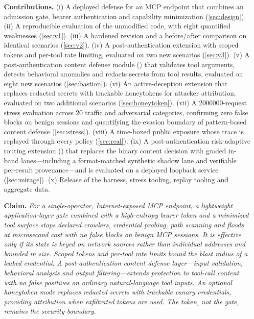 \documentclass[10pt,twocolumn]{article}
\begin{document}
\noindent\textbf{Contributions.}
(i) A deployed defense for an MCP endpoint that combines an admission gate,
bearer authentication and capability minimization (\cref{sec:design}).
(ii) A reproducible evaluation of the unmodified code, with eight quantified
weaknesses (\cref{sec:v1}).
(iii) A hardened revision and a before/after comparison on identical scenarios
(\cref{sec:v2}).
(iv) A post-authentication extension with scoped tokens and per-tool rate
limiting, evaluated on two new scenarios (\cref{sec:v3}).
(v) A post-authentication content defense module (\bastion{}) that validates
tool arguments, detects behavioral anomalies and redacts secrets from tool
results, evaluated on eight new scenarios (\cref{sec:bastion}).
(vi) An active-deception extension that replaces redacted secrets with
trackable honeytokens for attacker attribution, evaluated on two additional
scenarios (\cref{sec:honeytoken}).
(vii) A \num{2000000}-request stress evaluation across 20 traffic and
adversarial categories, confirming zero false blocks on benign sessions and
quantifying the evasion boundary of pattern-based content defense
(\cref{sec:stress}).
(viii) A time-boxed public exposure whose trace is replayed through every
policy (\cref{sec:real}).
(ix) A post-authentication risk-adaptive routing extension (\mirage{}) that
replaces the binary content decision with graded in-band lanes---including a
format-matched synthetic shadow lane and verifiable per-result provenance---and
is evaluated on a deployed loopback service (\cref{sec:mirage}).
(x) Release of the harness, stress tooling, replay tooling and aggregate data.

\noindent\textbf{Claim.} \emph{For a single-operator, Internet-exposed MCP
endpoint, a lightweight application-layer gate combined with a
high-entropy bearer token and a minimized tool surface stops declared
crawlers, credential probing, path scanning and floods at microsecond
cost with no false blocks on benign MCP sessions. It is effective only
if its state is keyed on network sources rather than individual addresses
and bounded in size. Scoped tokens and per-tool rate limits bound the
blast radius of a leaked credential. A post-authentication content
defense layer---input validation, behavioral analysis and output
filtering---extends protection to tool-call content with no false
positives on ordinary natural-language tool inputs. An optional honeytoken mode
replaces redacted secrets with trackable canary credentials, providing
attribution when exfiltrated tokens are used. The token, not the gate,
remains the security boundary.}
\end{document}
